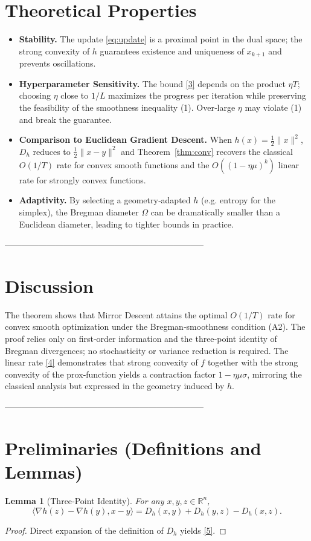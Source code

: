 \documentclass{article}
\newtheorem{lemma}{Lemma}
\newcommand{\R}{\mathbb{R}}
\newcommand{\inner}[2]{\langle #1,#2\rangle}
\newcommand{\D}[2]{D_{h}(#1,#2)}
\newcommand{\grad}{\nabla}
\begin{document}
\section*{Theoretical Properties}
\begin{itemize}
\item \textbf{Stability.} The update \eqref{eq:update} is a proximal point in the dual space; the strong convexity of $h$ guarantees existence and uniqueness of $x_{k+1}$ and prevents oscillations.
\item \textbf{Hyperparameter Sensitivity.} The bound \eqref{3} depends on the product $\eta T$; choosing $\eta$ close to $1/L$ maximizes the progress per iteration while preserving the feasibility of the smoothness inequality (1). Over‑large $\eta$ may violate (1) and break the guarantee.
\item \textbf{Comparison to Euclidean Gradient Descent.} When $h(x)=\frac12\|x\|^{2}$, $D_h$ reduces to $\frac12\|x-y\|^{2}$ and Theorem~\ref{thm:conv} recovers the classical $O(1/T)$ rate for convex smooth functions and the $O((1-\eta\mu)^{k})$ linear rate for strongly convex functions.
\item \textbf{Adaptivity.} By selecting a geometry‑adapted $h$ (e.g. entropy for the simplex), the Bregman diameter $\Omega$ can be dramatically smaller than a Euclidean diameter, leading to tighter bounds in practice.
\end{itemize}

-----------------------------------------------------------------------

\section*{Discussion}
The theorem shows that Mirror Descent attains the optimal $O(1/T)$ rate for convex smooth optimization under the Bregman‑smoothness condition (A2). The proof relies only on first‑order information and the three‑point identity of Bregman divergences; no stochasticity or variance reduction is required. The linear rate \eqref{4} demonstrates that strong convexity of $f$ together with the strong convexity of the prox‑function yields a contraction factor $1-\eta\mu\sigma$, mirroring the classical analysis but expressed in the geometry induced by $h$.

-----------------------------------------------------------------------

\section*{Preliminaries (Definitions and Lemmas)}
\begin{lemma}[Three‑Point Identity]\label{lem:3pt}
For any $x,y,z\in\R^{n}$,
\[
\inner{\grad h(z)-\grad h(y)}{x-y}= \D{x}{y}+ \D{y}{z}-\D{x}{z}. \tag{5}
\]
\end{lemma}
\begin{proof}
Direct expansion of the definition of $D_h$ yields \eqref{5}. \hfill\qedsymbol
\end{proof}
\end{document}
